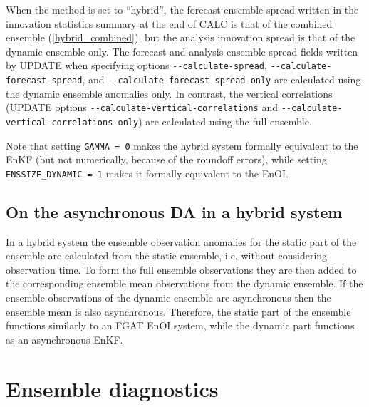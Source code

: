 \documentclass[11pt]{report}
\begin{document}
When the method is set to ``hybrid'', the forecast ensemble spread written in the innovation statistics summary at the end of CALC is that of the combined ensemble (\ref{hybrid_combined}), but the analysis innovation spread is that of the dynamic ensemble only.
The forecast and analysis ensemble spread fields written by UPDATE when specifying options \verb|--calculate-spread|, \verb|--calculate-forecast-spread|, and \verb|--calculate-forecast-spread-only| are calculated using the dynamic ensemble anomalies only.
In contrast, the vertical correlations (UPDATE options \verb|--calculate-vertical-correlations| and \verb|--calculate-vertical-correlations-only|) are calculated using the full ensemble.

Note that setting \verb|GAMMA = 0| makes the hybrid system formally equivalent to the EnKF (but not numerically, because of the roundoff errors), while setting \verb|ENSSIZE_DYNAMIC = 1| makes it formally equivalent to the EnOI.

\subsection{On the asynchronous DA in a hybrid system}

In a hybrid system the ensemble observation anomalies for the static part of the ensemble are calculated from the static ensemble, i.e. without considering observation time.
To form the full ensemble observations they are then added to the corresponding ensemble mean observations from the dynamic ensemble.
If the ensemble observations of the dynamic ensemble are asynchronous then the ensemble mean is also asynchronous.
Therefore, the static part of the ensemble functions similarly to an FGAT EnOI system, while the dynamic part functions as an asynchronous EnKF.

\section{Ensemble diagnostics}
\label{sec:diag}
\end{document}
